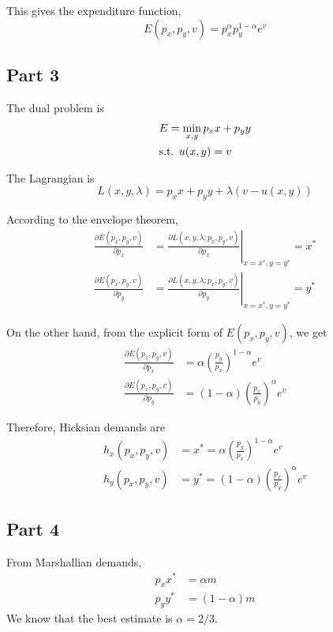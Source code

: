 \documentclass{article}
\begin{document}
This gives the expenditure function,
\begin{equation*}
	E(p_x,p_y,v)=p_x^\alpha p_y^{1-\alpha}e^v
\end{equation*}

\subsection{Part 3}
The dual problem is
\begin{align*}
	&E=\min_{x,y}p_xx+p_yy\\
	&\textup{s.t. }u(x,y)=v
\end{align*}

The Lagrangian is
\begin{equation*}
	L(x,y,\lambda)=p_xx+p_yy+\lambda(v-u(x,y))
\end{equation*}

According to the envelope theorem,
\begin{align*}
	\frac{\partial E(p_x,p_y,v)}{\partial p_x}&=\left.\frac{\partial L(x,y,\lambda;p_x,p_y,v)}{\partial p_x}\right|_{x=x^*,y=y^*}=x^*\\
	\frac{\partial E(p_x,p_y,v)}{\partial p_y}&=\left.\frac{\partial L(x,y,\lambda;p_x,p_y,v)}{\partial p_y}\right|_{x=x^*,y=y^*}=y^*
\end{align*}

On the other hand, from the explicit form of $E(p_x,p_y,v)$, we get
\begin{align*}
	\frac{\partial E(p_x,p_y,v)}{\partial p_x}&=\alpha\left(\frac{p_y}{p_x}\right)^{1-\alpha}e^v\\
	\frac{\partial E(p_x,p_y,v)}{\partial p_y}&=(1-\alpha)\left(\frac{p_x}{p_y}\right)^\alpha e^v
\end{align*}

Therefore, Hicksian demands are
\begin{align*}
	h_x(p_x,p_y,v)&=x^*=\alpha\left(\frac{p_y}{p_x}\right)^{1-\alpha}e^v\\
	h_y(p_x,p_y,v)&=y^*=(1-\alpha)\left(\frac{p_x}{p_y}\right)^\alpha e^v
\end{align*}

\subsection{Part 4}
From Marshallian demands,
\begin{align*}
	p_xx^*&=\alpha m\\
	p_yy^*&=(1-\alpha)m
\end{align*}
We know that the best estimate is $\alpha=2/3$.
\end{document}
